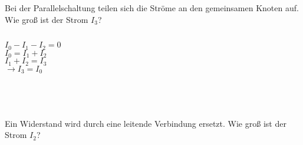 \begin{frame}
{\begin{columns}
		

	

			Bei der Parallelschaltung teilen sich die Ströme an den gemeinsamen
			Knoten auf. Wie groß ist der Strom $I_3$?\\



			
		\end{columns}
		\begin{columns}
			\vspace{-50pt}




			\pause


			$I_0-I_1-I_2 = 0$\\
			$I_0 = I_1 + I_2$\\
			$I_1+I_2 = I_3$\\
			$\rightarrow I_3 = I_0$

			\pause

			
			\phantom{.}

		\end{columns}

		\phantom{.}\\
		\begin{columns}
			\column[t]{0.6\textwidth}
			\vspace{-10pt}


			Ein Widerstand wird durch eine leitende Verbindung ersetzt.
			Wie groß ist der Strom $I_2$?\\

			\column[t]{0.4\textwidth}


\end{columns}}
\end{frame}
